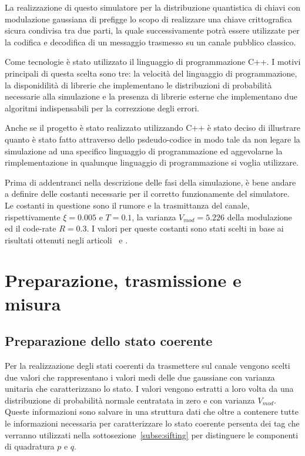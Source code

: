 La realizzazione di questo simulatore per la distribuzione quantistica di chiavi con modulazione gaussiana di prefigge lo scopo di realizzare una chiave crittografica sicura condivisa tra due parti, la quale successivamente potr\`a essere utilizzate per la codifica e decodifica di un messaggio trasmesso su un canale pubblico classico. 

Come tecnologie \`e stato utilizzato il linguaggio di programmazione C++. I motivi principali di questa scelta sono tre: la velocit\`a del linguaggio di programmazione, la disponidilit\`a di librerie che implementano le distribuzioni di probabilit\`a necessarie alla simulazione e la presenza di librerie esterne che implementano due algoritmi indispensabili per la correzzione degli errori.

Anche se il progetto \`e stato realizzato utilizzando C++ \`e stato deciso di illustrare quanto \`e stato fatto attraverso dello psdeudo-codice in modo tale da non legare la simulazione ad una specifico linguaggio di programmazione ed aggevolarne la rimplementazione in qualunque linguaggio di programmazione si voglia utilizzare.

Prima di addentranci nella descrizione delle fasi della simulazione, \`e bene andare a definire delle costanti necessarie per il corretto funzionamente del simulatore. Le costanti in questione sono il rumore e la trasmittanza del canale, rispettivamente $\xi = 0.005$ e $T=0.1$, la varianza $V_{mod}=5.226$ della modulazione ed il code-rate $R = 0.3$. I valori per queste costanti sono stati scelti in base ai risultati ottenuti negli articoli~\cite{https://doi.org/10.1002/qute.201800011} e \cite{e24101463}.

\section{Preparazione, trasmissione e misura}

\subsection{Preparazione dello stato coerente}\label{subse:prep-stato}
Per la realizzazione degli stati coerenti da trasmettere sul canale vengono scelti due valori che rappresentano i valori medi delle due gaussiane con varianza unitaria che caratterizzano lo stato. I valori vengono estratti a loro volta da una distribuzione di probabilit\`a normale centratata in zero e con varianza $V_{mod}$. Queste informazioni sono salvare in una struttura dati che oltre a contenere tutte le informazioni necessaria per caratterizzare lo stato coerente persenta dei tag che verranno utilizzati nella sottosezione~\ref{subse:sifting} per distinguere le componenti di quadratura $p$ e $q$.

